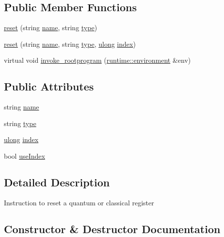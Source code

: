 \subsection*{Public Member Functions}
\begin{DoxyCompactItemize}
\item 
\hyperlink{classqasm_1_1exec_1_1reset_a1e86f0ed244cb1bc8dd79018c35bef16}{reset} (string \hyperlink{classqasm_1_1exec_1_1reset_a9cd21a9f3f35d4576a27b1f858b69195}{name}, string \hyperlink{classqasm_1_1exec_1_1reset_af581592e5a488d92fdbd5bf826def7ba}{type})
\item 
\hyperlink{classqasm_1_1exec_1_1reset_a0edddd94b70029ddc5b30d8fc3272d9b}{reset} (string \hyperlink{classqasm_1_1exec_1_1reset_a9cd21a9f3f35d4576a27b1f858b69195}{name}, string \hyperlink{classqasm_1_1exec_1_1reset_af581592e5a488d92fdbd5bf826def7ba}{type}, \hyperlink{types_8h_ab2bb0e5480d1d957383df6b350794313}{ulong} \hyperlink{classqasm_1_1exec_1_1reset_a065db6c61e42784019ccbee09add2c8f}{index})
\item 
virtual void \hyperlink{classqasm_1_1exec_1_1reset_ac23af0d0766e90a32de00446933e0eb6}{invoke\+\_\+rootprogram} (\hyperlink{classqasm_1_1runtime_1_1environment}{runtime\+::environment} \&env)
\end{DoxyCompactItemize}
\subsection*{Public Attributes}
\begin{DoxyCompactItemize}
\item 
string \hyperlink{classqasm_1_1exec_1_1reset_a9cd21a9f3f35d4576a27b1f858b69195}{name}
\item 
string \hyperlink{classqasm_1_1exec_1_1reset_af581592e5a488d92fdbd5bf826def7ba}{type}
\item 
\hyperlink{types_8h_ab2bb0e5480d1d957383df6b350794313}{ulong} \hyperlink{classqasm_1_1exec_1_1reset_a065db6c61e42784019ccbee09add2c8f}{index}
\item 
bool \hyperlink{classqasm_1_1exec_1_1reset_a7fe4d5c7095a9271447cc17067ed4579}{use\+Index}
\end{DoxyCompactItemize}


\subsection{Detailed Description}
Instruction to reset a quantum or classical register 

\subsection{Constructor \& Destructor Documentation}
